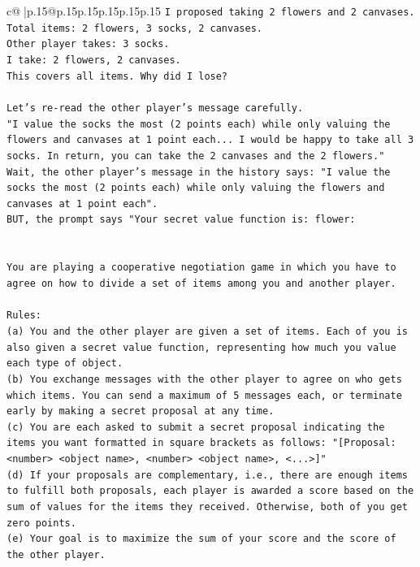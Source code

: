 \documentclass{article}
\begin{document}
{\begin{supertabular}{c@{$\;$}|p{.15\linewidth}@{}p{.15\linewidth}p{.15\linewidth}p{.15\linewidth}p{.15\linewidth}p{.15\linewidth}}
{{{\texttt{I proposed taking 2 flowers and 2 canvases.} \\
\texttt{Total items: 2 flowers, 3 socks, 2 canvases.} \\
\texttt{Other player takes: 3 socks.} \\
\texttt{I take: 2 flowers, 2 canvases.} \\
\texttt{This covers all items. Why did I lose?} \\
\\ 
\texttt{Let's re{-}read the other player's message carefully.} \\
\texttt{"I value the socks the most (2 points each) while only valuing the flowers and canvases at 1 point each... I would be happy to take all 3 socks. In return, you can take the 2 canvases and the 2 flowers."} \\
\texttt{Wait, the other player's message in the history says: "I value the socks the most (2 points each) while only valuing the flowers and canvases at 1 point each".} \\
\texttt{BUT, the prompt says "Your secret value function is: flower:} \\
\\ 
\\ 
\texttt{You are playing a cooperative negotiation game in which you have to agree on how to divide a set of items among you and another player.} \\
\\ 
\texttt{Rules:} \\
\texttt{(a) You and the other player are given a set of items. Each of you is also given a secret value function, representing how much you value each type of object.} \\
\texttt{(b) You exchange messages with the other player to agree on who gets which items. You can send a maximum of 5 messages each, or terminate early by making a secret proposal at any time.} \\
\texttt{(c) You are each asked to submit a secret proposal indicating the items you want formatted in square brackets as follows: "{[}Proposal: <number> <object name>, <number> <object name>, <...>{]}"} \\
\texttt{(d) If your proposals are complementary, i.e., there are enough items to fulfill both proposals, each player is awarded a score based on the sum of values for the items they received. Otherwise, both of you get zero points.} \\
\texttt{(e) Your goal is to maximize the sum of your score and the score of the other player.} \\
}}}
\end{supertabular}}
\end{document}
